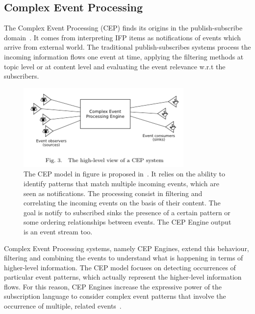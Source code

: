 \subsection{Complex Event Processing}\label{sec:cep}

The Complex Event Processing (CEP) finds its origins in the publish-subscribe domain~\cite{Eugster:2003:MFP:857076.857078}. It comes from interpreting IFP items as notifications of events which arrive from  external world. The traditional publish-subscribes systems process the incoming information flows one event at time, applying the filtering methods at topic level or at content level and evaluating the event relevance w.r.t the subscribers. 

\begin{figure}[tbh]
  \centering
	\includegraphics[width=0.75\linewidth]{images/cep}
	\caption[General CEP Model]{The CEP model in figure is proposed in~\cite{Cugola:2012:PFI:2187671.2187677}. It relies on the ability to identify patterns that match multiple incoming events, which are seen as notifications. The processing consist in filtering and correlating the incoming events on the basis of their content. The goal is notify to subscribed sinks the presence of a certain pattern or some ordering relationships between events. The CEP Engine output is an event stream too.} 
  	\label{fig:cep}
\end{figure}



Complex Event Processing systems, namely CEP Engines, extend this behaviour, filtering and combining the events to understand what is happening in terms of higher-level information. The CEP model focuses on detecting occurrences of particular event patterns, which actually represent the higher-level information flows. For this reason, CEP Engines increase the expressive power of the subscription language to consider complex event patterns that involve the occurrence of multiple, related events~\cite{Cugola:2012:PFI:2187671.2187677}.


